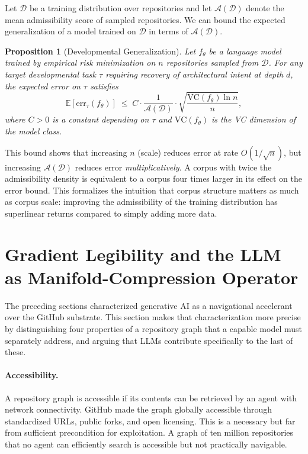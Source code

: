 \documentclass[11pt]{article}
\newtheorem{proposition}[theorem]{Proposition}
\begin{document}
Let $\mathcal{D}$ be a training distribution over repositories and let
$\mathcal{A}(\mathcal{D})$ denote the mean admissibility score of sampled
repositories. We can bound the expected generalization of a model trained on
$\mathcal{D}$ in terms of $\mathcal{A}(\mathcal{D})$.

\begin{proposition}[Developmental Generalization]
Let $f_\theta$ be a language model trained by empirical risk minimization on
$n$ repositories sampled from $\mathcal{D}$. For any target developmental task
$\tau$ requiring recovery of architectural intent at depth $d$, the expected
error on $\tau$ satisfies
\[
\mathbb{E}[\mathrm{err}_\tau(f_\theta)]
\;\leq\; C \cdot \frac{1}{\mathcal{A}(\mathcal{D})} \cdot
\sqrt{\frac{\mathrm{VC}(f_\theta) \ln n}{n}},
\]
where $C > 0$ is a constant depending on $\tau$ and $\mathrm{VC}(f_\theta)$
is the VC dimension of the model class.
\end{proposition}

This bound shows that increasing $n$ (scale) reduces error at rate
$O(1/\sqrt{n})$, but increasing $\mathcal{A}(\mathcal{D})$ reduces error
\emph{multiplicatively}. A corpus with twice the admissibility density is
equivalent to a corpus four times larger in its effect on the error bound.
This formalizes the intuition that corpus structure matters as much as corpus
scale: improving the admissibility of the training distribution has superlinear
returns compared to simply adding more data.


\section{Gradient Legibility and the LLM as Manifold-Compression Operator}
\label{sec:gradient}

The preceding sections characterized generative AI as a navigational
accelerant over the GitHub substrate. This section makes that characterization
more precise by distinguishing four properties of a repository graph that a
capable model must separately address, and arguing that LLMs contribute
specifically to the last of these.

\paragraph{Accessibility.}
A repository graph is accessible if its contents can be retrieved by an agent
with network connectivity. GitHub made the graph globally accessible through
standardized URLs, public forks, and open licensing. This is a necessary but
far from sufficient precondition for exploitation. A graph of ten million
repositories that no agent can efficiently search is accessible but not
practically navigable.
\end{document}
